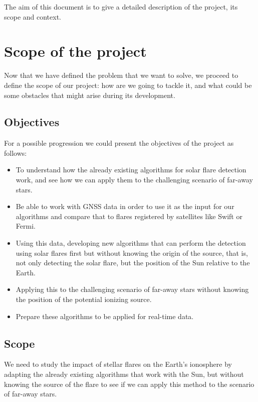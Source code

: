 \documentclass[12pt]{article}
\begin{document}
The aim of this document is to give a detailed description of the project, its scope and context.\\


\newpage
\section{Scope of the project}

Now that we have defined the problem that we want to solve, we proceed to define the scope of our project: how are we going to tackle it, and what could be some obstacles that might arise during its development.

\subsection{Objectives}

For a possible progression we could present the objectives of the project as follows:

\begin{itemize}
  \item To understand how the already existing algorithms for solar flare detection work, and see how we can apply them to the challenging scenario of far-away stars.
  \item Be able to work with GNSS data in order to use it as the input for our algorithms and compare that to flares registered by satellites like Swift or Fermi.
  \item Using this data, developing new algorithms that can perform the detection using solar flares first but without knowing the origin of the source, that is, not only detecting the solar flare, but the position of the Sun relative to the Earth.
  \item Applying this to the challenging scenario of far-away stars without knowing the position of the potential ionizing source.
  \item Prepare these algorithms to be applied for real-time data.
\end{itemize}

\subsection{Scope}

We need to study the impact of stellar flares on the Earth’s ionosphere by adapting the already existing algorithms that work with the Sun, but without knowing the source of the flare to see if we can apply this method to the scenario of far-away stars.\\
\end{document}
